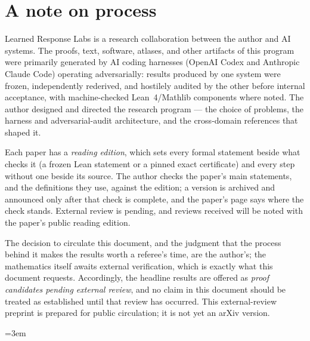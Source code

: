 \documentclass[11pt]{article}
\begin{document}
\section*{A note on process}
Learned Response Labs is a research collaboration between the author and AI systems. The proofs, text,
software, atlases, and other artifacts of this program were primarily generated by AI coding harnesses
(OpenAI Codex and Anthropic Claude Code) operating adversarially: results produced by one system were
frozen, independently rederived, and hostilely audited by the other before internal acceptance, with
machine-checked Lean~4/Mathlib components where noted. The author designed and directed the research
program --- the choice of problems, the harness and adversarial-audit architecture, and the cross-domain
references that shaped it. \par Each paper has a \emph{reading edition}, which sets every formal statement
beside what checks it (a frozen Lean statement or a pinned exact certificate) and every step without one
beside its source. The author checks the paper's main statements, and the definitions they use, against
the edition; a version is archived and announced only after that check is complete, and the paper's page
says where the check stands. External review is pending, and reviews received will be noted with the
paper's public reading edition. \par The decision to circulate this document, and the
judgment that the process behind it makes the results worth a referee's time, are the author's; the
mathematics itself awaits external verification, which is exactly what this document requests.
Accordingly, the headline results are offered as \emph{proof candidates pending external review}, and no
claim in this document should be treated as established until that review has occurred. This
external-review preprint is prepared for public circulation; it is not yet an arXiv version.




\clearpage
\appendix
\begingroup\sloppy\emergencystretch=3em
\providecommand{\CyclicArchiveDOI}{DOI-PENDING}
\end{document}
